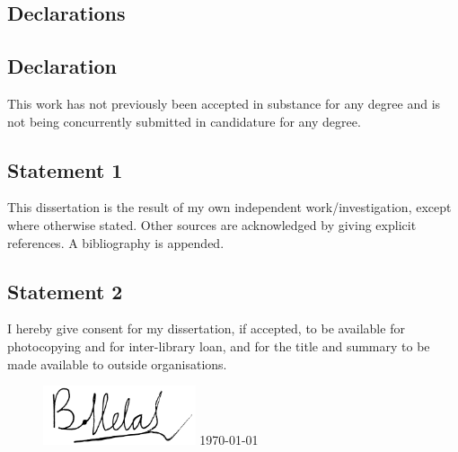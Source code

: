 \documentclass[12pt]{article}
\begin{document}
    \begin{center}
        \section*{Declarations}
    \end{center}
    \subsection*{Declaration}
    This work has not previously been accepted in substance for any degree and is
    not being concurrently submitted in candidature for any degree.

    \subsection*{Statement 1}
    This dissertation is the result of my own independent work/investigation, except
    where otherwise stated.
    Other sources are acknowledged by giving explicit references.
    A bibliography is appended.

    \subsection*{Statement 2}
    I hereby give consent for my dissertation, if accepted, to be available for
    photocopying and for inter-library loan, and for the title and summary to be
    made available to outside organisations.

    \bigskip
    \begin{figure}[h!]
        \centering
        \includegraphics[width=0.4\textwidth]{Signature.png}
        \linebreak
        \today\label{fig:signature}
    \end{figure}

    \newpage


    \pagebreak

    \renewcommand*\contentsname{
    \begin{center}
        Table of Contents
    \end{center}}

    \tableofcontents
\end{document}

